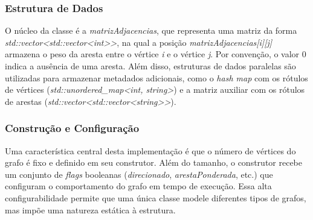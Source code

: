 \documentclass{sbc2023}%
\begin{document}








        \subsubsection{Estrutura de Dados}
    
        O núcleo da classe é a \textit{matrizAdjacencias}, que representa uma matriz da forma \textit{std::vector<std::vector<int>>}, na qual a posição \textit{matrizAdjacencias[i][j]} armazena o peso da aresta entre o vértice \textit{i} e o vértice \textit{j}. Por convenção, o valor 0 indica a ausência de uma aresta. Além disso, estruturas de dados paralelas são utilizadas para armazenar metadados adicionais, como o \textit{hash map} com os rótulos de vértices (\textit{std::unordered\_map<int, string>}) e a matriz auxiliar com os rótulos de arestas (\textit{std::vector<std::vector<string>>}).
    
        \subsubsection{Construção e Configuração}
    
        Uma característica central desta implementação é que o número de vértices do grafo é fixo e definido em seu construtor. Além do tamanho, o construtor recebe um conjunto de \textit{flags} booleanas (\textit{direcionado}, \textit{arestaPonderada}, etc.) que configuram o comportamento do grafo em tempo de execução. Essa alta configurabilidade permite que uma única classe modele diferentes tipos de grafos, mas impõe uma natureza estática à estrutura.
    
\end{document}
